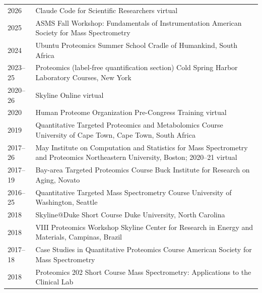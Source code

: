 \documentclass[11pt]{article}
\begin{document}
\begin{longtable}{V}
  2026 & Claude Code for Scientific Researchers
    \newline virtual \\
  2025 & ASMS Fall Workshop: Fundamentals of Instrumentation
    \newline American Society for Mass Spectrometry \\
  2024 & Ubuntu Proteomics Summer School
    \newline Cradle of Humankind, South Africa \\
  2023--25 & Proteomics (label-free quantification section)
    \newline Cold Spring Harbor Laboratory Courses, New York\\
  2020--26 & Skyline Online
    \newline virtual \\
  2020 & Human Proteome Organization Pre-Congress Training
      \newline virtual \\
  2019 &  Quantitative Targeted Proteomics and Metabolomics Course
      \newline University of Cape Town, Cape Town, South Africa \\
  2017--26 & May Institute on Computation and Statistics for Mass Spectrometry and Proteomics
    \newline Northeastern University, Boston; 2020--21 virtual \\
  2017--19 & Bay-area Targeted Proteomics Course
    \newline Buck Institute for Research on Aging, Novato \\
  2016--25 & Quantitative Targeted Mass Spectrometry Course
    \newline University of Washington, Seattle \\
  2018 &  Skyline@Duke Short Course
      \newline Duke University, North Carolina \\
  2018 &  VIII Proteomics Workshop Skyline
      \newline Center for Research in Energy and Materials, Campinas, Brazil \\
  2017--18 & Case Studies in Quantitative Proteomics Course
    \newline American Society for Mass Spectrometry \\
  2018 & Proteomics 202 Short Course
    \newline Mass Spectrometry: Applications to the Clinical Lab \\

\end{longtable}
\end{document}
